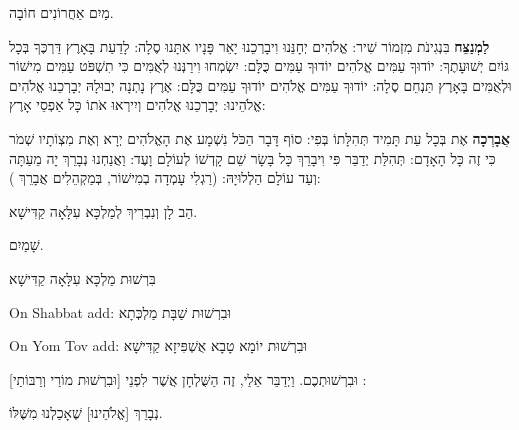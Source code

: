 

מַיִם אַחֲרוֹנִים חוֹבָה.

\textbf{לַמְנַצֵּח} בִּנְגִינֹת מִזְמוֹר שִׁיר: אֱלֹהִים יְחָנֵּנוּ וִיבָרְכֵנוּ יָאֵר פָּנָיו אִתָּנוּ סֶלָה: לָדַעַת בָּאָרֶץ דַּרְכֶּךָ בְּכָל גּוֹיִם יְשׁוּעָתֶךָ: יוֹדוּךָ עַמִּים אֱלֹהִים יוֹדוּךָ עַמִּים כֻּלָּם: יִשְׂמְחוּ וִירַנְּנוּ לְאֻמִּים כִּי תִשְׁפֹּט עַמִּים מִישׁוֹר וּלְאֻמִּים בָּאָרֶץ תַּנְחֵם סֶלָה: יוֹדוּךָ עַמִּים אֱלֹהִים יוֹדוּךָ עַמִּים כֻּלָּם: אֶרֶץ נָתְנָה יְבוּלָהּ יְבָרְכֵנוּ אֱלֹהִים אֱלֹהֵינוּ: יְבָרְכֵנוּ אֱלֹהִים וְיִירְאוּ אֹתוֹ כָּל אַפְסֵי אָרֶץ:

\textbf{אֲבָרְכָה} אֶת \Shem{} בְּכָל עֵת תָּמִיד תְּהִלָּתוֹ בְּפִי: סוֹף דָּבָר הַכֹּל נִשְׁמָע אֶת הָאֱלֹהִים יְרָא וְאֶת מִצְוֹתָיו שְׁמֹר כִּי זֶה כָּל הָאָדָם: תְּהִלַּת \Shem{} יְדַבֵּר פִּי וִיבָרֵךְ כָּל בָּשָׂר שֵׁם קָדְשׁוֹ לְעוֹלָם וָעֶד: וַאֲנַחְנוּ נְבָרֵךְ יָה מֵעַתָּה וְעַד עוֹלָם הַלְלוּיָהּ: (רַגְלִי עָמְדָה בְמִישׁוֹר, בְּמַקְהֵלִים אֲבָרֵךְ \Shem{}):

\divider

הַב לָן וְנִבְרִיךְ לְמַלְכָּא עִלָּאָה קַדִּישָׁא.

שָׁמַיִם.

בִּרְשׁוּת מַלְכָּא עִלָּאָה קַדִּישָׁא

\begin{seasonal}{On Shabbat add:}
וּבִרְשׁוּת שַׁבָּת מַלְכְּתָא
\end{seasonal}

\begin{seasonal}{On Yom Tov add:}
וּבִרְשׁוּת יוֹמָא טָבָא אֻשְׁפִּיזָא קַדִּישָׁא
\end{seasonal}

[וּבִרְשׁוּת מוֹרַי וְרַבּוֹתַי] וּבִרְשׁוּתְכֶם. וַיְדַבֵּר אֵלַי, זֶה הַשֻּׁלְחָן אֲשֶׁר לִפְנֵי \Shem{}:

נְבָרֵךְ [אֱלֹהֵינוּ] שֶׁאָכַלְנוּ מִשֶּׁלּוֹ.

